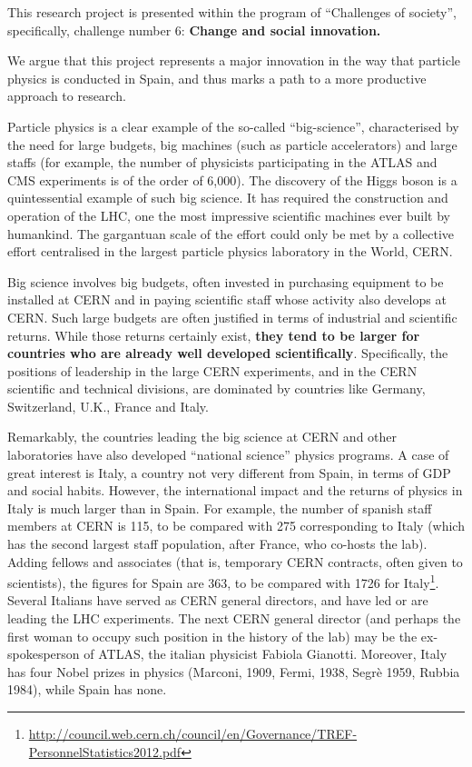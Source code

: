 %
This research project is presented within the program of ``Challenges of society'', specifically, challenge number 6: {\bf Change and social innovation.}

We argue that this project represents a major innovation in the way that particle physics is conducted in Spain, and thus marks a path to a more productive approach to research.

Particle physics is a clear example of the so-called ``big-science'',
characterised by the need for large budgets, big machines (such as particle accelerators) and large staffs (for example, the number of physicists participating in the ATLAS and CMS experiments is of the order of 6,000). The discovery of the Higgs boson is a quintessential example of such big science. It has required the construction and operation of the LHC, one the most impressive scientific machines ever built by humankind. The gargantuan scale of the effort could only be met by a collective effort centralised in the largest particle physics laboratory in the World, CERN.  

Big science involves big budgets, often invested in purchasing equipment to be installed at CERN and in paying scientific staff whose activity also develops at CERN. Such large budgets are often justified in terms of industrial and scientific returns. While those returns certainly exist, {\bf they tend to be larger for countries who are already well developed scientifically}. Specifically, the positions of leadership in the large CERN experiments, and in the CERN scientific and technical divisions, are dominated by countries like Germany, Switzerland, U.K., France and Italy. 

Remarkably, the countries leading the big science at CERN and other laboratories have also developed ``national science'' physics programs. A case of great interest is Italy, a country not very different from Spain, in terms of GDP and social habits. However, the international impact and the returns of physics in Italy is much larger than in Spain. For example, the number of spanish staff members at CERN is 115, to be compared with 275 corresponding to Italy (which has the second largest staff population, after France, who co-hosts the lab). Adding fellows and associates (that is, temporary CERN contracts, often given to scientists), the figures for Spain are 363, to be compared with 1726 for Italy\footnote{\href{http://council.web.cern.ch/council/en/Governance/TREF-PersonnelStatistics2012.pdf}{http://council.web.cern.ch/council/en/Governance/TREF-PersonnelStatistics2012.pdf}}. Several Italians have served as CERN general directors, and have led or are leading the LHC experiments. The next CERN general director (and perhaps the first woman to occupy such position in the history of the lab) may be the ex-spokesperson of ATLAS, the italian physicist Fabiola Gianotti. Moreover, Italy has four Nobel prizes in physics (Marconi, 1909, Fermi, 1938, Segrè 1959, Rubbia 1984), while Spain has none. 

